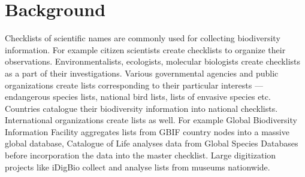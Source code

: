 \documentclass{bmcart}
\begin{document}
\begin{frontmatter}
\begin{abstractbox}
\begin{keyword}
\end{keyword}


\end{abstractbox}
%

\end{frontmatter}


\newpage
\section*{Background}


  Checklists of scientific names are commonly used for collecting biodiversity
  information. For example citizen scientists create checklists to organize
  their observations. Environmentalists, ecologists, molecular biologists
  create checklists as a part of their investigations. Various governmental
  agencies and public organizations create lists corresponding to their
  particular interests --- endangerous species lists, national bird lists,
  lists of envasive species etc. Countries catalogue their biodiversity
  information into national checklists. International organizations create
  lists as well. For example Global Biodiversity Information Facility
  aggregates lists from GBIF country nodes into a massive global database,
  Catalogue of Life analyses data from Global Species Databases before
  incorporation the data into the master checklist. Large digitization projects
  like iDigBio collect and analyse lists from museums nationwide.
\end{document}
